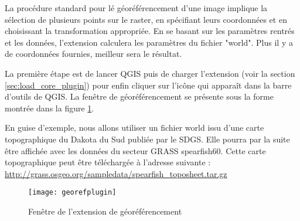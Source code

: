 La procédure standard pour lé géoréférencement d'une image implique la sélection de plusieurs points sur le raster, en spécifiant leurs coordonnées et en choisissant la transformation appropriée. En se basant sur les paramètres rentrés et les données, l'extension calculera les paramètres du fichier "world". Plus il y a de coordonnées fournies, meilleur sera le résultat.


La première étape est de lancer QGIS puis de charger l'extension (voir la section \ref{sec:load_core_plugin}) pour enfin cliquer sur l'icône  qui apparaît dans la barre d'outils de QGIS. La fenêtre de géoréférencement se présente sous la forme montrée dans la figure \ref{fig:georefplugin}.
 

En guise d'exemple, nous allons utiliser un fichier world issu d'une carte topographique du Dakota du Sud publiée par le SDGS.
Elle pourra par la suite être affichée avec les données du secteur GRASS spearfish60. Cette carte topographique peut être téléchargée à l'adresse suivante : \url{http://grass.osgeo.org/sampledata/spearfish\_toposheet.tar.gz}


\begin{figure}[ht]
\begin{center}
  \texttt{[image: georefplugin]}
  \caption{Fenêtre de l'extension de géoréférencement \nixcaption}\label{fig:georefplugin}
\end{center}
\end{figure}

